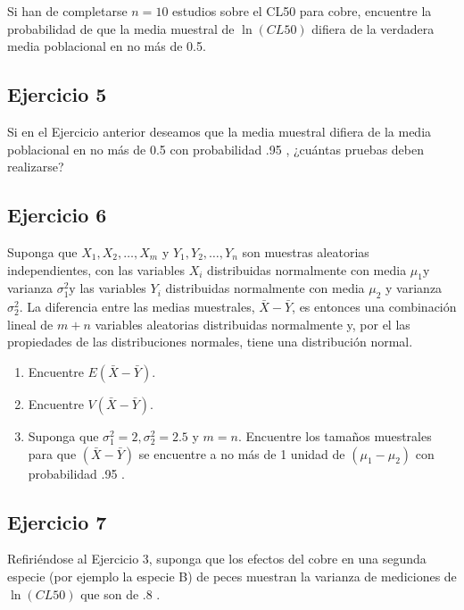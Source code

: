 \documentclass[
]{article}
\providecommand{\tightlist}{%
  \setlength{\itemsep}{0pt}\setlength{\parskip}{0pt}}
\begin{document}
Si han de completarse \(n=10\) estudios sobre el CL50 para cobre, encuentre la probabilidad de que la media muestral de \(\ln(CL50)\) difiera de la verdadera media poblacional en no más de 0.5.

\subsection{Ejercicio 5}\label{ejercicio-5-1}

Si en el Ejercicio anterior deseamos que la media muestral difiera de la media poblacional en no más de 0.5 con probabilidad .95 , ¿cuántas pruebas deben realizarse?

\subsection{Ejercicio 6}\label{ejercicio-6-1}

Suponga que \(X_{1}, X_{2}, \ldots, X_{m}\) y \(Y_{1}, Y_{2}, \ldots, Y_{n}\) son muestras aleatorias independientes, con las variables \(X_{i}\) distribuidas normalmente con media \(\mu_{1} \mathrm{y}\) varianza \(\sigma_{1}^{2} \mathrm{y}\) las variables \(Y_{i}\) distribuidas normalmente con media \(\mu_{2}\) y varianza \(\sigma_{2}^{2}\). La diferencia entre las medias muestrales, \(\bar{X}-\bar{Y}\), es entonces una combinación lineal de \(m+n\) variables aleatorias distribuidas normalmente y, por el las propiedades de las distribuciones normales, tiene una distribución normal.

\begin{enumerate}
\def\labelenumi{\alph{enumi}.}
\tightlist
\item
  Encuentre \(E(\bar{X}-\bar{Y})\).
\item
  Encuentre \(V(\bar{X}-\bar{Y})\).
\item
  Suponga que \(\sigma_{1}^{2}=2, \sigma_{2}^{2}=2.5\) y \(m=n\). Encuentre los tamaños muestrales para que \((\bar{X}-\bar{Y})\) se encuentre a no más de 1 unidad de \(\left(\mu_{1}-\mu_{2}\right)\) con probabilidad .95 .
\end{enumerate}

\subsection{Ejercicio 7}\label{ejercicio-7-1}

Refiriéndose al Ejercicio 3, suponga que los efectos del cobre en una segunda especie (por ejemplo la especie B) de peces muestran la varianza de mediciones de \(\ln(CL50)\) que son de .8 .
\end{document}

